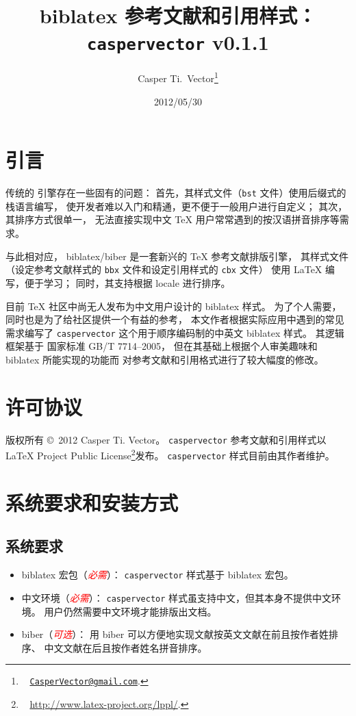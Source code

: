\documentclass[UTF8, fancyhdr, hyperref]{ctexart}
\newcommand{\myemph}[1]{\emph{\textcolor{red}{#1}}}
\begin{document}
\title{\textbf{biblatex 参考文献和引用样式：\texttt{caspervector} v0.1.1}}
\author{%
	Casper Ti.\ Vector\thanks{\ %
		\href{mailto:CasperVector@gmail.com}{\texttt{CasperVector@gmail.com}}.%
	}%
}
\date{2012/05/30}
\maketitle

\section{引言}

传统的  引擎存在一些固有的问题：
首先，其样式文件（\verb|bst| 文件）使用后缀式的栈语言编写，
使开发者难以入门和精通，更不便于一般用户进行自定义；
其次，其排序方式很单一，
无法直接实现中文 \TeX{} 用户常常遇到的按汉语拼音排序等需求。

与此相对应，
biblatex\supercite{biblatex}/biber\supercite{biber}
是一套新兴的 \TeX{} 参考文献排版引擎，
其样式文件（设定参考文献样式的 \verb|bbx| 文件和设定引用样式的 \verb|cbx| 文件）
使用 \LaTeX{} 编写，便于学习；
同时，其支持根据 locale 进行排序。

目前 \TeX{} 社区中尚无人发布为中文用户设计的 biblatex 样式。
为了个人需要，同时也是为了给社区提供一个有益的参考，
本文作者根据实际应用中遇到的常见需求编写了
\verb|caspervector| 这个用于顺序编码制的中英文 biblatex 样式。
其逻辑框架基于
国家标准 GB/T 7714--2005\supercite{gbt7714-2005}，
但在其基础上根据个人审美趣味和 biblatex 所能实现的功能而
对参考文献和引用格式进行了较大幅度的修改。

\section{许可协议}

版权所有 \copyright\ 2012 Casper Ti. Vector。%
\verb|caspervector| 参考文献和引用样式以
\LaTeX{} Project Public License\footnote{\ %
	\url{http://www.latex-project.org/lppl/}.%
}发布。
\verb|caspervector| 样式目前由其作者维护。

\section{系统要求和安装方式}
\subsection{系统要求}

\begin{itemize}
	\item biblatex 宏包（\myemph{必需}）：
		\verb|caspervector| 样式基于 biblatex 宏包。
	\item 中文环境（\myemph{必需}）：
		\verb|caspervector| 样式虽支持中文，但其本身不提供中文环境。
		用户仍然需要中文环境才能排版出文档。
	\item biber（\myemph{可选}）：
		用 biber 可以方便地实现文献按英文文献在前且按作者姓排序、
		中文文献在后且按作者姓名拼音排序。
\end{itemize}
\end{document}
